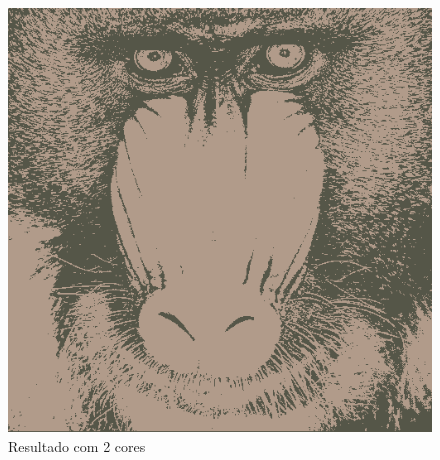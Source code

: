 \documentclass{article}
\begin{document}
\begin{figure}[!htb]
\begin{minipage}{0.42\textwidth}
    \includegraphics[width=.99\linewidth]{images/res2.png}
    \caption{Resultado com 2 cores}\label{Fig:res2}
  \end{minipage}
\end{figure}
\end{document}
